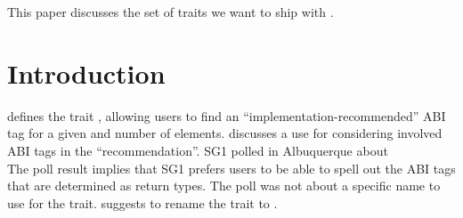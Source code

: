 \newcommand\wgTitle{Finding the right set of traits for \code{simd<T>}}
\newcommand\wgName{Matthias Kretz <m.kretz@gsi.de>}
\newcommand\wgDocumentNumber{DXXXXR0}
\newcommand\wgGroup{SG1, LEWG}

\usepackage{mymacros}
\usepackage{wg21}
\usepackage{underscore}



\newcommand\simd[1][]{\type{simd#1}\xspace}
\newcommand\simdT{\type{simd<T>}\xspace}
\newcommand\valuetype{\type{value\_type}\xspace}
\newcommand\referencetype{\type{reference}\xspace}
\newcommand\whereexpression{\type{where\_expression}\xspace}
\newcommand\simdcast{\code{simd\_cast}\xspace}
\newcommand\mask[1][]{\type{simd\_mask#1}\xspace}
\newcommand\maskT{\type{simd\_mask<T>}\xspace}
\newcommand\fixedsizeN{\type{simd\_abi::fixed\_size<N>}\xspace}
\newcommand\fixedsizescoped{\type{simd\_abi::fixed\_size}\xspace}
\newcommand\fixedsize{\type{fixed\_size}\xspace}
\newcommand\simdEP{\code{execution::}\type{simd}\xspace}
\newcommand\seqEP{\code{execution::}\type{seq}\xspace}
\newcommand\realArithmeticType{vectorizable type\xspace}

\usepackage{pifont}

\newcommand\foralli[1][]{for all \code i $\in$ \code{[0, #1size())}\xspace}
\newcommand\forallmaskedi[1]{%
  for all \code i
  $\in \{j \in \mathbb{N}_0 | j < \code{size()} ⋀ \code{#1[}j\code{]}\}$%
  \xspace%
}
\newcommand\chck{\item[\color{black}\ensuremath{\checkmark}]}
\newcommand\todo{\item[\color{black}\ding{46}] \color{gray}}
\newcommand\itemheader[1]{\item[] \hfill \textcolor{gray}{\textsc{#1}}}


\begin{wgTitlepage}
  This paper discusses the set of traits we want to ship with \simdT.
\end{wgTitlepage}

\pagestyle{scrheadings}
\section{Introduction}
\textcite{P0214R8} defines the trait , allowing users to find an “implementation-recommended” ABI tag for a given \valuetype and number of elements.
\textcite{P0820R1} discusses a use for considering involved ABI tags in the “recommendation”.
SG1 polled in Albuquerque about\\
\noindent The poll result implies that SG1 prefers users to be able to spell out the ABI tags that are determined as return types.
The poll was not about a specific name to use for the trait.
\textcite{P0820R1} suggests to rename the trait to .

